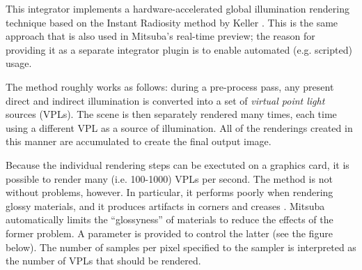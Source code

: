 This integrator implements a hardware-accelerated global illumination
rendering technique based on the Instant Radiosity method by Keller
\cite{Keller1997Instant}. This is the same approach that is also used in
Mitsuba's real-time preview; the reason for providing it as a separate
integrator plugin is to enable automated (e.g. scripted) usage.

The method roughly works as follows: during a pre-process pass, any present direct
and indirect illumination is converted into a set of \emph{virtual point light}
sources (VPLs). The scene is then separately rendered many times, each time using
a different VPL as a source of illumination. All of the renderings created in this
manner are accumulated to create the final output image.

Because the individual rendering steps can be exectuted on a
graphics card, it is possible to render many (i.e. 100-1000) VPLs
per second. The method is not without problems, however. In particular,
it performs poorly when rendering glossy materials, and it produces
artifacts in corners and creases . Mitsuba automatically limits
the ``glossyness'' of materials to reduce the effects of the former
problem. A  parameter is provided to control the latter
(see the figure below). The number of samples per pixel specified to
the sampler is interpreted as the number of VPLs that should be rendered.

